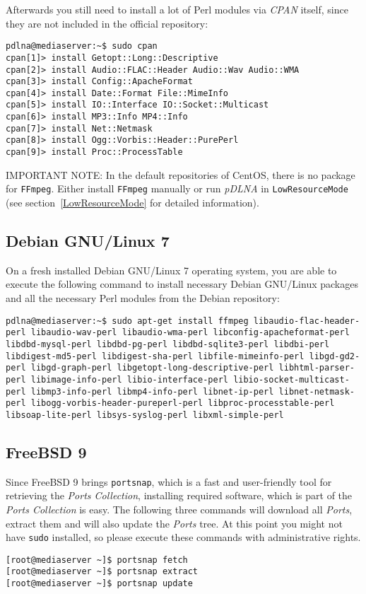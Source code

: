 Afterwards you still need to install a lot of Perl modules via {\em CPAN} itself, since they are not included in the official repository:
\begin{lstlisting}
pdlna@mediaserver:~$ sudo cpan
cpan[1]> install Getopt::Long::Descriptive
cpan[2]> install Audio::FLAC::Header Audio::Wav Audio::WMA
cpan[3]> install Config::ApacheFormat
cpan[4]> install Date::Format File::MimeInfo
cpan[5]> install IO::Interface IO::Socket::Multicast
cpan[6]> install MP3::Info MP4::Info
cpan[7]> install Net::Netmask
cpan[8]> install Ogg::Vorbis::Header::PurePerl
cpan[9]> install Proc::ProcessTable
\end{lstlisting}

\begin{colframeimportantnote}
\textsc{IMPORTANT NOTE:} In the default repositories of CentOS, there is no package for \verb|FFmpeg|. Either install \verb|FFmpeg| manually or run {\em pDLNA} in \verb|LowResourceMode| (see section~\ref{LowResourceMode} for detailed information).
\end{colframeimportantnote}

\subsection{Debian GNU/Linux 7}

On a fresh installed Debian GNU/Linux 7 operating system, you are able to execute the following command to install necessary Debian GNU/Linux packages and all the necessary Perl modules from the Debian repository:
\begin{lstlisting}
pdlna@mediaserver:~$ sudo apt-get install ffmpeg libaudio-flac-header-perl libaudio-wav-perl libaudio-wma-perl libconfig-apacheformat-perl libdbd-mysql-perl libdbd-pg-perl libdbd-sqlite3-perl libdbi-perl libdigest-md5-perl libdigest-sha-perl libfile-mimeinfo-perl libgd-gd2-perl libgd-graph-perl libgetopt-long-descriptive-perl libhtml-parser-perl libimage-info-perl libio-interface-perl libio-socket-multicast-perl libmp3-info-perl libmp4-info-perl libnet-ip-perl libnet-netmask-perl libogg-vorbis-header-pureperl-perl libproc-processtable-perl libsoap-lite-perl libsys-syslog-perl libxml-simple-perl
\end{lstlisting}

\subsection{FreeBSD 9}

Since FreeBSD 9 brings \verb|portsnap|, which is a fast and user-friendly tool for retrieving the {\em Ports Collection}, installing required software, which is part of the {\em Ports Collection} is easy. The following three commands will download all {\em Ports}, extract them and will also update the {\em Ports} tree. At this point you might not have \verb|sudo| installed, so please execute these commands with administrative rights.
\begin{lstlisting}
[root@mediaserver ~]$ portsnap fetch
[root@mediaserver ~]$ portsnap extract
[root@mediaserver ~]$ portsnap update
\end{lstlisting}

